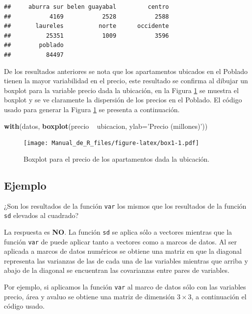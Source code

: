 \documentclass[10pt,]{krantz}
\makeatletter
\newenvironment{Shaded}{\begin{snugshade}}{\end{snugshade}}
\newcommand{\KeywordTok}[1]{\textcolor[rgb]{0.13,0.29,0.53}{\textbf{{#1}}}}
\newcommand{\DataTypeTok}[1]{\textcolor[rgb]{0.13,0.29,0.53}{{#1}}}
\newcommand{\StringTok}[1]{\textcolor[rgb]{0.31,0.60,0.02}{{#1}}}
\newcommand{\NormalTok}[1]{{#1}}
\newenvironment{kframe}{%
\medskip{}
\setlength{\fboxsep}{.8em}
 \def\at@end@of@kframe{}%
 \ifinner\ifhmode%
  \def\at@end@of@kframe{\end{minipage}}%
  \begin{minipage}{\columnwidth}%
 \fi\fi%
 \def\FrameCommand##1{\hskip\@totalleftmargin \hskip-\fboxsep
 \colorbox{shadecolor}{##1}\hskip-\fboxsep
     \hskip-\linewidth \hskip-\@totalleftmargin \hskip\columnwidth}%
 \MakeFramed {\advance\hsize-\width
   \@totalleftmargin\z@ \linewidth\hsize
   \@setminipage}}%
 {\par\unskip\endMakeFramed%
 \at@end@of@kframe}
\renewenvironment{Shaded}{\begin{kframe}}{\end{kframe}}
\makeatother
\begin{document}
\begin{verbatim}
##     aburra sur belen guayabal         centro 
##           4169           2528           2588 
##       laureles          norte      occidente 
##          25351           1009           3596 
##        poblado 
##          84497
\end{verbatim}

De los resultados anteriores se nota que los apartamentos ubicados en el
Poblado tienen la mayor variabilidad en el precio, este resultado se
confirma al dibujar un boxplot para la variable precio dada la
ubicación, en la Figura \ref{fig:box1} se muestra el boxplot y se ve
claramente la dispersión de los precios en el Poblado. El código usado
para generar la Figura \ref{fig:box1} se presenta a continuación.

\begin{Shaded}
\begin{Highlighting}[]
\KeywordTok{with}\NormalTok{(datos, }\KeywordTok{boxplot}\NormalTok{(precio ~}\StringTok{ }\NormalTok{ubicacion, }\DataTypeTok{ylab=}\StringTok{'Precio (millones)'}\NormalTok{))}
\end{Highlighting}
\end{Shaded}

\begin{figure}[htbp]
\centering
\texttt{[image: Manual\_de\_R\_files/figure-latex/box1-1.pdf]}
\caption{\label{fig:box1}Boxplot para el precio de los apartamentos dada la
ubicación.}
\end{figure}

\subsection*{Ejemplo}\label{ejemplo-40}


¿Son los resultados de la función \texttt{var} los mismos que los
resultados de la función \texttt{sd} elevados al cuadrado?

La respuesta es \textbf{NO}. La función \texttt{sd} se aplica sólo a
vectores mientras que la función \texttt{var} de puede aplicar tanto a
vectores como a marcos de datos. Al ser aplicada a marcos de datos
numéricos se obtiene una matriz en que la diagonal representa las
varianzas de las de cada una de las variables mientras que arriba y
abajo de la diagonal se encuentran las covarianzas entre pares de
variables.

Por ejemplo, si aplicamos la función \texttt{var} al marco de datos sólo
con las variables precio, área y avaluo se obtiene una matriz de
dimensión \(3 \times 3\), a continuación el código usado.
\end{document}
